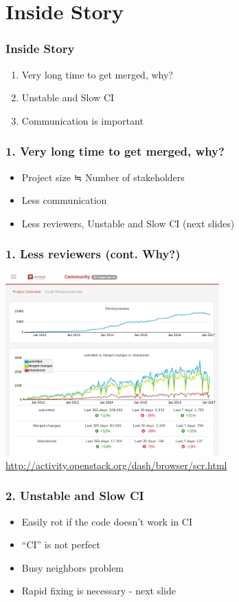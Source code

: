 \documentclass[aspectratio=169,11pt,hyperref={colorlinks=true}]{beamer}
\begin{document}
\section{Inside Story}
\begin{frame}
  \frametitle{Inside Story}
  \begin{enumerate}
    \item Very long time to get merged, why?
    \item Unstable and Slow CI
    \item Communication is important
  \end{enumerate}
\end{frame}

\begin{frame}
  \frametitle{1. Very long time to get merged, why?}
  \begin{itemize}
    \item Project size ≒ Number of stakeholders
    \item Less communication
    \item Less reviewers,  Unstable and Slow CI (next slides)
  \end{itemize}
\end{frame}

\begin{frame}
  \frametitle{1. Less reviewers (cont. Why?)}
  \centering\includegraphics[height=70mm]{images/project-overview.png}
  \url{http://activity.openstack.org/dash/browser/scr.html}
\end{frame}

\begin{frame}
  \frametitle{2. Unstable and Slow CI}
  \begin{itemize}
    \item Easily rot if the code doesn't work in CI
    \item ``CI'' is not perfect
    \item Busy neighbors problem
    \item Rapid fixing is necessary - next slide
  \end{itemize}
\end{frame}
\end{document}
